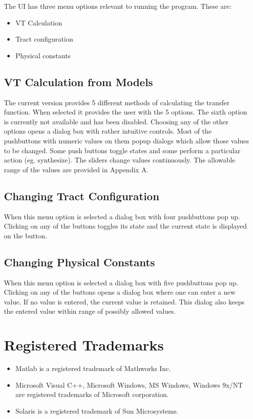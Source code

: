The UI has three menu options relevant to running the program.
These are:
\begin{itemize}
\item VT Calculation
\item Tract configuration
\item Physical constants
\end{itemize}

\subsection{VT Calculation from Models}
The current version provides 5 different methods of calculating
the transfer function. When selected it provides the user with the
5 options. The sixth option is currently not available and has
been disabled. Choosing any of the other options opens a dialog
box with rather intuitive controls. Most of the pushbuttons with
numeric values on them popup dialogs which allow those values to
be changed. Some push buttons toggle states and some perform a
particular action (eg. synthesize). The sliders change values
continuously. The allowable range of the values are provided in
Appendix A.

\subsection{Changing Tract Configuration}
When this menu option is selected a dialog box with four
pushbuttons pop up. Clicking on any of the buttons toggles its
state and the current state is displayed on the button.

\subsection{Changing Physical Constants}
When this menu option is selected a dialog box with five
pushbuttons pop up. Clicking on any of the buttons opens a dialog
box where one can enter a new value. If no value is entered, the
current value is retained. This dialog also keeps the entered
value within range of possibly allowed values.

\section{Registered Trademarks}
\begin{itemize}
\item Matlab is a registered trademark of Mathworks Inc.
\item Microsoft Visual C++, Microsoft Windows, MS Windows, Windows 9x/NT are registered trademarks
of Microsoft corporation.
\item Solaris is a registered trademark of Sun Microsystems.
\end{itemize}
